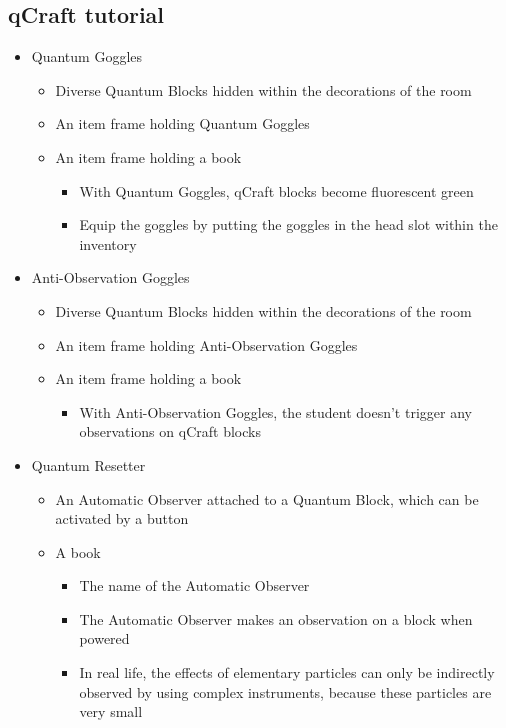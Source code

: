 \documentclass[11pt,twoside]{report} %
\begin{document}
\subsection{qCraft tutorial}
\begin{itemize}
	\item Quantum Goggles
	\begin{itemize}
		\item Diverse Quantum Blocks hidden within the decorations of the room
		\item An item frame holding Quantum Goggles
		\item An item frame holding a book
		\begin{itemize}
			\item With Quantum Goggles, qCraft blocks become fluorescent green
			\item Equip the goggles by putting the goggles in the head slot within the inventory
		\end{itemize}
	\end{itemize}
	\item Anti-Observation Goggles
	\begin{itemize}
		\item Diverse Quantum Blocks hidden within the decorations of the room
		\item An item frame holding Anti-Observation Goggles
		\item An item frame holding a book
		\begin{itemize}
			\item With Anti-Observation Goggles, the student doesn't trigger any observations on qCraft blocks
		\end{itemize}
	\end{itemize}
	\item Quantum Resetter
	\begin{itemize}
		\item An Automatic Observer attached to a Quantum Block, which can be activated by a button
		\item A book
		\begin{itemize}
			\item The name of the Automatic Observer
			\item The Automatic Observer makes an observation on a block when powered
			\item In real life, the effects of elementary particles can only be indirectly observed by using complex instruments, because these particles are very small
		\end{itemize}
	\end{itemize}
\end{itemize}
\end{document}
